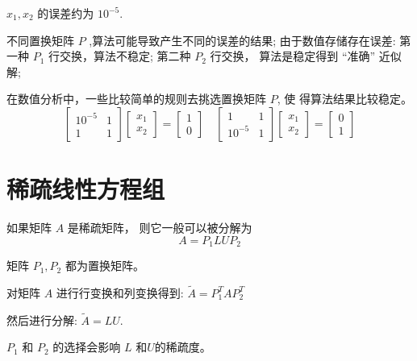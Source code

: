\begin{example}
    \begin{remark}
        $ x_{1}, x_{2} $ 的误差约为 $ 10^{-5} $.
    \end{remark}

\end{example}


不同置换矩阵 $ P $ ,算法可能导致产生不同的误差的结果; 由于数值存储存在误差:
第一种 $ P_{1} $ 行交换，算法不稳定;
第二种 $ P_{2} $ 行交换， 算法是稳定得到 “准确” 近似解;

在数值分析中，一些比较简单的规则去挑选置换矩阵 $ P  $, 使 得算法结果比较稳定。
\begin{equation}
    \left[\begin{array}{cc}
            10^{-5} & 1 \\
            1       & 1
        \end{array}\right]\left[\begin{array}{l}
            x_{1} \\
            x_{2}
        \end{array}\right]=\left[\begin{array}{l}
            1 \\
            0
        \end{array}\right] \quad\left[\begin{array}{cc}
            1       & 1 \\
            10^{-5} & 1
        \end{array}\right]\left[\begin{array}{l}
            x_{1} \\
            x_{2}
        \end{array}\right]=\left[\begin{array}{l}
            0 \\
            1
        \end{array}\right]
\end{equation}





\section{稀疏线性方程组}

\begin{theorem}
    如果矩阵 $ {A} $ 是稀疏矩阵， 则它一般可以被分解为
    \begin{equation}
        A=P_{1} L U P_{2}
    \end{equation}

    矩阵 $ P_{1}, P_{2} $ 都为置换矩阵。
\end{theorem}

\begin{corollary}
    对矩阵 $ {A} $ 进行行变换和列变换得到: $ \tilde{A}=P_{1}^{T} A P_{2}^{T} $

    然后进行分解: $ \tilde{{A}}=L U $.
\end{corollary}



$ P_{1} $ 和 $ P_{2} $ 的选择会影响 $ {L} $ 和$U$的稀疏度。

